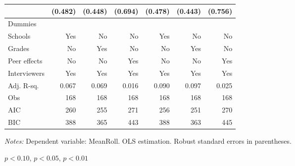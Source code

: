 \begin{table}[htbp]
\begin{adjustbox}{width=1\textwidth}
\begin{threeparttable}
\begin{tabular}{l*{6}{D{.}{.}{-1}}}
                    &             (0.482)   &             (0.448)   &             (0.694)   &             (0.478)   &             (0.443)   &             (0.756)   \\ \midrule
Dummies &&&&& \\                    
Schools             &                 Yes   &                  No   &                  No   &                 Yes   &                  No   &                  No   \\
Grades              &                  No   &                 Yes   &                  No   &                  No   &                 Yes   &                  No   \\
Peer effects        &                  No   &                  No   &                 Yes   &                  No   &                  No   &                 Yes   \\
Interviewers        &                 Yes   &                 Yes   &                 Yes   &                 Yes   &                 Yes   &                 Yes   \\
\midrule
Adj. R-sq.          &               0.067   &               0.069   &               0.016   &               0.090   &               0.097   &               0.025   \\
Obs                 &                 168   &                 168   &                 168   &                 168   &                 168   &                 168   \\
AIC                 &                 260   &                 255   &                 271   &                 256   &                 251   &                 270   \\
BIC                 &                 388   &                 365   &                 443   &                 388   &                 363   &                 445   \\
\bottomrule
\end{tabular}

\begin{tablenotes}
\footnotesize
\item \textit{Notes:} Dependent variable: MeanRoll. OLS estimation. Robust standard errors in parentheses.
\item \sym{*} \(p<0.10\), \sym{**} \(p<0.05\), \sym{***} \(p<0.01\)
\end{tablenotes}
\end{threeparttable}
\end{adjustbox}
\label{tab:cheat_math}
\end{table}
